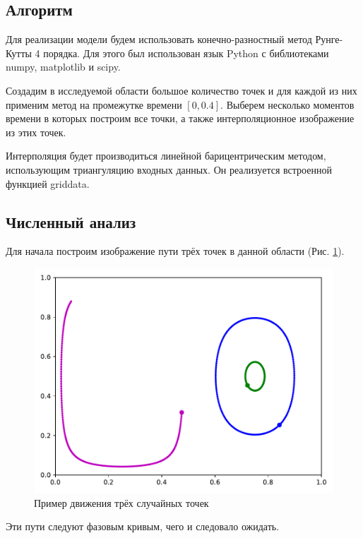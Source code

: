     \subsection{Алгоритм}
        Для реализации модели будем использовать конечно-разностный метод Рунге-Кутты 4 порядка. Для этого был использован язык Python с библиотеками numpy, matplotlib и scipy.

        Создадим в исследуемой области большое количество точек и для каждой из них применим метод на промежутке времени \( [0, 0.4] \). Выберем несколько моментов времени в которых построим все точки, а также интерполяционное изображение из этих точек.
        
        Интерполяция будет производиться линейной барицентрическим методом, использующим триангуляцию входных данных. Он реализуется встроенной функцией griddata.

    \subsection{Численный анализ}
        Для начала построим изображение пути трёх точек в данной области (Рис. \ref{3pts}).
        \begin{figure}[H]
            \centering
            \includegraphics[width=12cm]{pictures/three.pdf}
            \caption{Пример движения трёх случайных точек} \label{3pts}
        \end{figure}
        Эти пути следуют фазовым кривым, чего и следовало ожидать.

